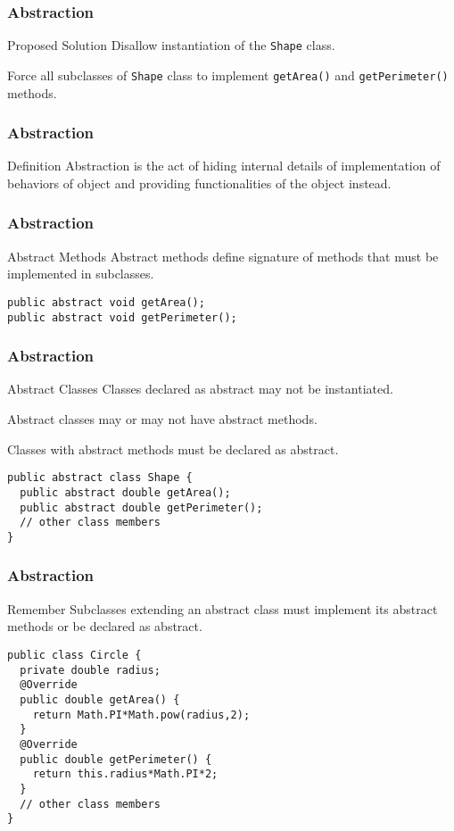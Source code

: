 \documentclass[10pt, compress]{beamer}
\begin{document}
\begin{frame}[fragile]
  \frametitle{Abstraction}
  \begin{block}{Proposed Solution}
    Disallow instantiation of the \texttt{Shape} class.

    Force all subclasses of \texttt{Shape} class to implement \texttt{getArea()} and \texttt{getPerimeter()} methods.
  \end{block}
\end{frame}

\begin{frame}[fragile]
  \frametitle{Abstraction}
  \begin{block}{Definition}
    Abstraction is the act of hiding internal details of implementation of behaviors of object and providing functionalities of the object instead.
  \end{block}
\end{frame}

\begin{frame}[fragile]
  \frametitle{Abstraction}
  \begin{block}{Abstract Methods}
    Abstract methods define signature of methods that must be implemented in subclasses.
    \begin{verbatim}
public abstract void getArea();
public abstract void getPerimeter();
    \end{verbatim}
  \end{block}
\end{frame}

\begin{frame}[fragile]
  \frametitle{Abstraction}
  \begin{block}{Abstract Classes}
    Classes declared as abstract may not be instantiated.

    Abstract classes may or may not have abstract methods.

    Classes with abstract methods must be declared as abstract.
  \end{block}
    \begin{verbatim}
public abstract class Shape {
  public abstract double getArea();
  public abstract double getPerimeter();
  // other class members
}
    \end{verbatim}
\end{frame}

\begin{frame}[fragile]
  \frametitle{Abstraction}
  \begin{block}{Remember}
    Subclasses extending an abstract class must implement its abstract methods or be declared as abstract.
  \end{block}
    \begin{verbatim}
public class Circle {
  private double radius;
  @Override
  public double getArea() {
    return Math.PI*Math.pow(radius,2);
  }
  @Override
  public double getPerimeter() {
    return this.radius*Math.PI*2;
  }
  // other class members
}
    \end{verbatim}
\end{frame}
\end{document}
